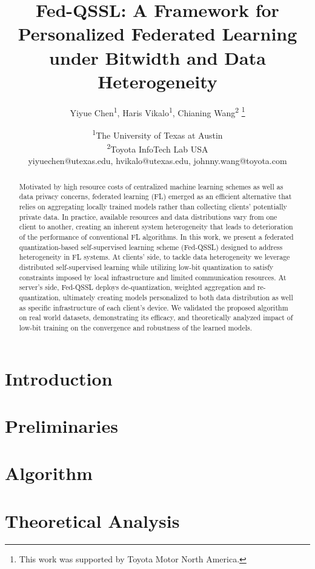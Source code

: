 \documentclass[a4paper,11pt]{article}
\title{Fed-QSSL: A Framework for Personalized Federated Learning under Bitwidth and Data Heterogeneity}
\author{
    Yiyue Chen\textsuperscript{\rm 1},
    Haris Vikalo\textsuperscript{\rm 1},
    Chianing Wang\textsuperscript{\rm 2}
    \thanks{This work was supported by Toyota Motor North America.}
}
\date{
    \textsuperscript{\rm 1}The University of Texas at Austin\\
    \textsuperscript{\rm 2}Toyota InfoTech Lab USA\\
    yiyuechen@utexas.edu,  hvikalo@utexas.edu,
    johnny.wang@toyota.com
}
\begin{document}
	\maketitle
		\vskip 0.3in
	
\begin{abstract}
	Motivated by high resource costs of centralized machine learning schemes as well as data privacy concerns, federated learning (FL) emerged as an efficient alternative that relies on aggregating locally trained models rather than collecting clients' potentially private data. In practice, available resources and data distributions vary from one client to another, creating an inherent system heterogeneity that leads to deterioration of the performance of conventional FL algorithms. In this work, we present a federated quantization-based self-supervised learning scheme (Fed-QSSL) designed to address heterogeneity in FL systems. At clients' side, to tackle data heterogeneity we leverage distributed self-supervised learning while utilizing low-bit quantization to satisfy constraints imposed by local infrastructure and limited communication resources. At server's side, Fed-QSSL deploys de-quantization, weighted aggregation and re-quantization, ultimately creating models personalized to both data distribution as well as specific infrastructure of each client's device. We validated the proposed algorithm on real world datasets, demonstrating its efficacy, and theoretically analyzed impact of low-bit training on the convergence and robustness of the learned models.
\end{abstract}
\section{Introduction}


\section{Preliminaries}


\section{Algorithm}


\section{Theoretical Analysis}

\end{document}
